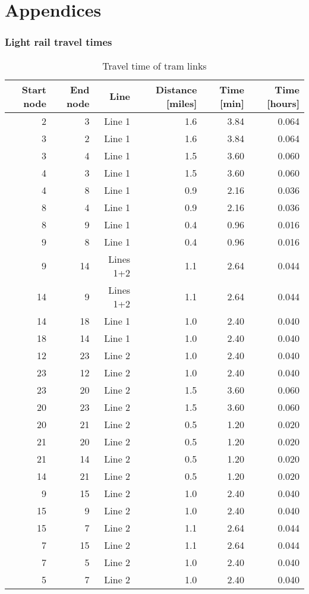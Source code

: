 \appendix
\part*{Appendices}

\section{Light rail travel times}
\label{sec:tram_travel_times}

\begin{table}
\centering
\begin{tabular}{rrrrrr}
\toprule
Start node & End node & Line & Distance [miles] & Time [min] & Time [hours] \\
\midrule
2 & 3 & Line 1 & 1.6 & 3.84 & 0.064 \\
3 & 2 & Line 1 & 1.6 & 3.84 & 0.064 \\
3 & 4 & Line 1 & 1.5 & 3.60 & 0.060 \\
4 & 3 & Line 1 & 1.5 & 3.60 & 0.060 \\
4 & 8 & Line 1 & 0.9 & 2.16 & 0.036 \\
8 & 4 & Line 1 & 0.9 & 2.16 & 0.036 \\
8 & 9 & Line 1 & 0.4 & 0.96 & 0.016 \\
9 & 8 & Line 1 & 0.4 & 0.96 & 0.016 \\
9 & 14 & Lines 1+2 & 1.1 & 2.64 & 0.044 \\
14 & 9 & Lines 1+2 & 1.1 & 2.64 & 0.044 \\
14 & 18 & Line 1 & 1.0 & 2.40 & 0.040 \\
18 & 14 & Line 1 & 1.0 & 2.40 & 0.040 \\
12 & 23 & Line 2 & 1.0 & 2.40 & 0.040 \\
23 & 12 & Line 2 & 1.0 & 2.40 & 0.040 \\
23 & 20 & Line 2 & 1.5 & 3.60 & 0.060 \\
20 & 23 & Line 2 & 1.5 & 3.60 & 0.060 \\
20 & 21 & Line 2 & 0.5 & 1.20 & 0.020 \\
21 & 20 & Line 2 & 0.5 & 1.20 & 0.020 \\
21 & 14 & Line 2 & 0.5 & 1.20 & 0.020 \\
14 & 21 & Line 2 & 0.5 & 1.20 & 0.020 \\
9 & 15 & Line 2 & 1.0 & 2.40 & 0.040 \\
15 & 9 & Line 2 & 1.0 & 2.40 & 0.040 \\
15 & 7 & Line 2 & 1.1 & 2.64 & 0.044 \\
7 & 15 & Line 2 & 1.1 & 2.64 & 0.044 \\
7 & 5 & Line 2 & 1.0 & 2.40 & 0.040 \\
5 & 7 & Line 2 & 1.0 & 2.40 & 0.040 \\
\bottomrule
\end{tabular}
\caption{Travel time of tram links}
\end{table}

